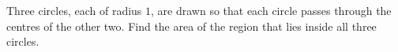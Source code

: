 Three circles, each of radius $1$, are drawn so that each circle passes through the centres of the other two. Find the area of the region that lies inside all three circles.
